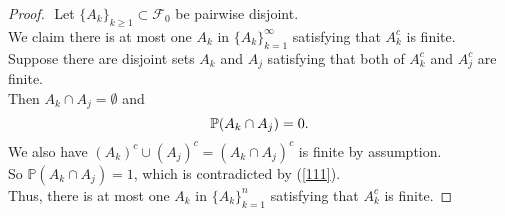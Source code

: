 \documentclass{article}
\newcommand{\bbp}{\mathbb{P}}
\newcommand{\llf}{\mathcal{F}}
\begin{document}
\begin{proof} 
	$ $\newline
	Let $\{A_k\}_{k\geq 1} \subset \llf_0$ be pairwise disjoint.\\
	We claim there is at most one $A_k$ in $\{A_k\}_{k=1}^{\infty}$ satisfying that $A_k^c$ is finite.\\
	Suppose there are disjoint sets $A_k$ and $A_j$ satisfying that both of $A_k^c$ and $A_j^c$ are finite.\\
	Then $A_k \cap A_j = \emptyset$ and 
	\begin{equation}\label{111} 
		\bbp(A_k \cap A_j) = 0.\\
	\end{equation}
	We also have $(A_k)^c \cup (A_j)^c = (A_k \cap A_j)^c $ is finite by assumption.\\
	So $\bbp (A_k \cap A_j) = 1$, which is contradicted by (\ref{111}).\\
	Thus, there is at most one $A_k$ in $\{A_k\}_{k=1}^n$ satisfying that $A_k^c$ is finite.


\end{proof}
\end{document}

